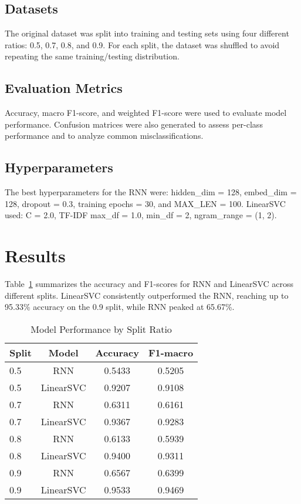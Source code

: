 \documentclass[twocolumn,10pt]{article}
\begin{document}
\subsection{Datasets}
The original dataset was split into training and testing sets using four different ratios: 0.5, 0.7, 0.8, and 0.9. For each split, the dataset was shuffled to avoid repeating the same training/testing distribution.  

\subsection{Evaluation Metrics}
Accuracy, macro F1-score, and weighted F1-score were used to evaluate model performance. Confusion matrices were also generated to assess per-class performance and to analyze common misclassifications.  

\subsection{Hyperparameters}
The best hyperparameters for the RNN were: hidden\_dim = 128, embed\_dim = 128, dropout = 0.3, training epochs = 30, and MAX\_LEN = 100. LinearSVC used: C = 2.0, TF-IDF max\_df = 1.0, min\_df = 2, ngram\_range = (1, 2).  

\section{Results}

Table~\ref{tab:results_summary} summarizes the accuracy and F1-scores for RNN and LinearSVC across different splits. LinearSVC consistently outperformed the RNN, reaching up to 95.33\% accuracy on the 0.9 split, while RNN peaked at 65.67\%.  

\begin{table}[h!]
\centering
\caption{Model Performance by Split Ratio}
\label{tab:results_summary}
\begin{tabular}{lccc}
\toprule
Split & Model & Accuracy & F1-macro \\
\midrule
0.5 & RNN & 0.5433 & 0.5205 \\
0.5 & LinearSVC & 0.9207 & 0.9108 \\
0.7 & RNN & 0.6311 & 0.6161 \\
0.7 & LinearSVC & 0.9367 & 0.9283 \\
0.8 & RNN & 0.6133 & 0.5939 \\
0.8 & LinearSVC & 0.9400 & 0.9311 \\
0.9 & RNN & 0.6567 & 0.6399 \\
0.9 & LinearSVC & 0.9533 & 0.9469 \\
\bottomrule
\end{tabular}
\end{table}
\end{document}

